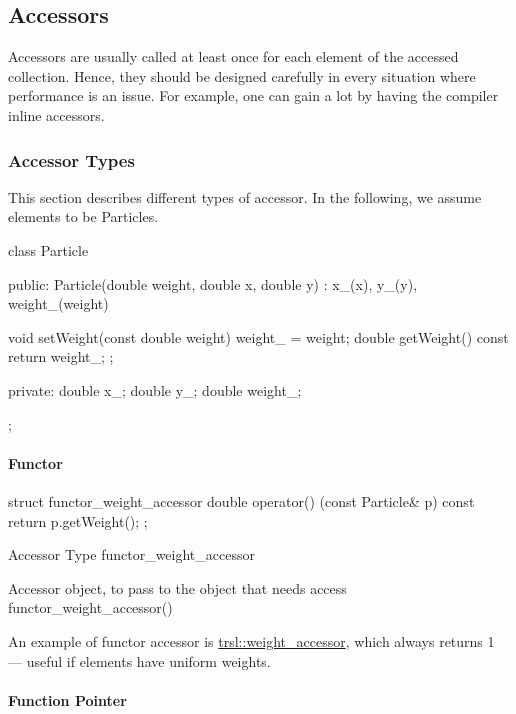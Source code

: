 \hypertarget{group__accessor}{
\subsection{Accessors}
\label{group__accessor}
}
Accessors are usually called at least once for each element of the accessed collection. Hence, they should be designed carefully in every situation where performance is an issue. For example, one can gain a lot by having the compiler inline accessors.\hypertarget{group__accessor_accessor_accessor_types}{}\subsubsection{Accessor Types}\label{group__accessor_accessor_accessor_types}
This section describes different types of accessor. In the following, we assume elements to be {\ttfamily Particle}s. 
\begin{DoxyCode}
 class Particle
 {
 public:
   Particle(double weight, double x, double y) :
     x_(x), y_(y), weight_(weight) {}
   
   void setWeight(const double weight) { weight_ = weight; }
   double getWeight() const { return weight_; };
 
 private:
   double x_;
   double y_;
   double weight_;
 };
\end{DoxyCode}
\hypertarget{group__accessor_accessor_functor}{}\paragraph{Functor}\label{group__accessor_accessor_functor}

\begin{DoxyCode}
 struct functor_weight_accessor {
   double operator() (const Particle& p) const
   { return p.getWeight(); }
 };
\end{DoxyCode}



\begin{DoxyDescription}
\item[Accessor Type ]{\ttfamily functor\_\-weight\_\-accessor} 
\item[Accessor object, to pass to the object that needs access ]{\ttfamily functor\_\-weight\_\-accessor()} 
\end{DoxyDescription}

An example of functor accessor is \hyperlink{structtrsl_1_1weight__accessor}{trsl::weight\_\-accessor}, which always returns 1 --- useful if elements have uniform weights.\hypertarget{group__accessor_accessor_functionpointer}{}\paragraph{Function Pointer}\label{group__accessor_accessor_functionpointer}

